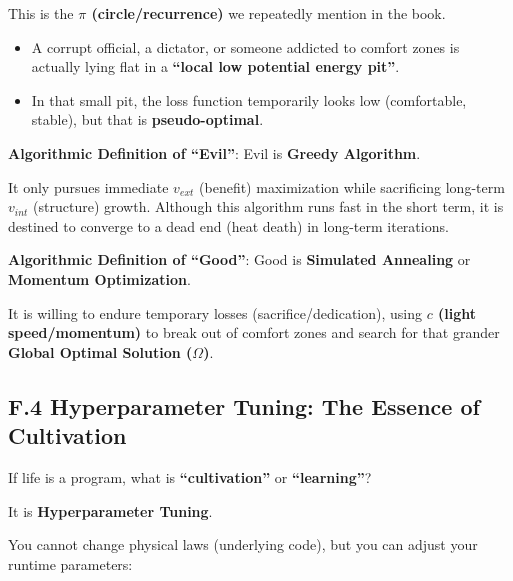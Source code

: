 This is the \textbf{$\pi$ (circle/recurrence)} we repeatedly mention in the book.

\begin{itemize}
\item A corrupt official, a dictator, or someone addicted to comfort zones is actually lying flat in a \textbf{``local low potential energy pit''}.

\item In that small pit, the loss function temporarily looks low (comfortable, stable), but that is \textbf{pseudo-optimal}.
\end{itemize}

\textbf{Algorithmic Definition of ``Evil''}: Evil is \textbf{Greedy Algorithm}.

It only pursues immediate $v_{ext}$ (benefit) maximization while sacrificing long-term $v_{int}$ (structure) growth. Although this algorithm runs fast in the short term, it is destined to converge to a dead end (heat death) in long-term iterations.

\textbf{Algorithmic Definition of ``Good''}: Good is \textbf{Simulated Annealing} or \textbf{Momentum Optimization}.

It is willing to endure temporary losses (sacrifice/dedication), using \textbf{$c$ (light speed/momentum)} to break out of comfort zones and search for that grander \textbf{Global Optimal Solution ($\Omega$)}.

\subsection{F.4 Hyperparameter Tuning: The Essence of Cultivation}

If life is a program, what is \textbf{``cultivation''} or \textbf{``learning''}?

It is \textbf{Hyperparameter Tuning}.

You cannot change physical laws (underlying code), but you can adjust your runtime parameters:

